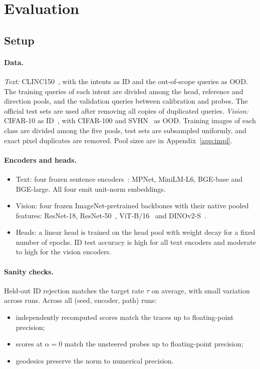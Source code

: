\documentclass[11pt]{article}
\theoremstyle{definition}
\theoremstyle{remark}
\begin{document}
\section{Evaluation}\label{sec:eval}

\subsection{Setup}
\paragraph{Data.} \emph{Text:} CLINC150~\citep{larson2019clinc}, with the intents as ID and the out-of-scope
queries as OOD. The training queries of each intent are divided among the head, reference and direction
pools, and the validation queries between calibration and probes. The official test sets are used after
removing all copies of duplicated queries. \emph{Vision:} CIFAR-10 as ID~\citep{krizhevsky2009cifar}, with
CIFAR-100 and SVHN~\citep{netzer2011svhn} as OOD. Training images of each class are divided among the five
pools, test sets are subsampled uniformly, and exact pixel duplicates are removed. Pool sizes are in
Appendix~\ref{app:impl}.

\paragraph{Encoders and heads.}
\begin{itemize}
\item Text: four frozen sentence encoders~\citep{reimers2019sbert,xiao2023bge}: MPNet, MiniLM-L6, BGE-base
and BGE-large. All four emit unit-norm embeddings.
\item Vision: four frozen ImageNet-pretrained backbones with their native pooled features: ResNet-18,
ResNet-50~\citep{he2016resnet}, ViT-B/16~\citep{dosovitskiy2021vit} and DINOv2-S~\citep{oquab2023dinov2}.
\item Heads: a linear head is trained on the head pool with weight decay for a fixed number of epochs.
ID test accuracy is high for all text encoders and moderate to high for the vision encoders.
\end{itemize}

\paragraph{Sanity checks.} Held-out ID rejection matches the target rate $\tau$ on average, with small
variation across runs.
Across all (seed, encoder, path) runs:
\begin{itemize}
\item independently recomputed scores match the traces up to floating-point precision;
\item scores at $\alpha=0$ match the unsteered probes up to floating-point precision;
\item geodesics preserve the norm to numerical precision.
\end{itemize}
\end{document}
